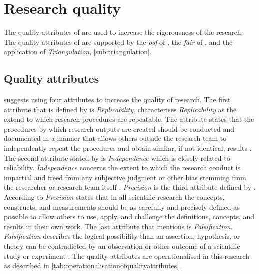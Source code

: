 \section{Research quality}
\label{sec:researchquality}
The quality attributes of \textcite[p.~15--17]{Recker2013} are used to increase the rigorousness of the research. The quality attributes of \textcite[p.~15--17]{Recker2013} are supported by the \textit{\acrfull{osf}} of \textcite{Foster2017}, the \textit{\gls{fair}} of \textcite[Box 2]{Wilkinson2016}, and the application of \textit{Triangulation}, \cref{sub:triangulation}.
\subsection{Quality attributes}
\label{sub:qualityattributes}
\textcite[p. 15-17]{Recker2013} suggests using four attributes to increase the quality of research. The first attribute that is defined by \textcite[p.~15]{Recker2013} is \textit{Replicability}. \textcite[p.~15]{Recker2013} characterises \textit{Replicability} as the extend to which research procedures are repeatable. The attribute states that the procedures by which research outputs are created should be conducted and documented in a manner that allows others outside the research team to independently repeat the procedures and obtain similar, if not identical, results \parencite[p.~15]{Recker2013}. The second attribute stated by \textcite[p.~16]{Recker2013} is \textit{Independence} which is closely related to reliability. \textit{Independence} concerns the extent to which the research conduct is impartial and freed from any subjective judgment or other bias stemming from the researcher or research team itself \parencite[p.~16]{Recker2013}. \textit{Precision} is the third attribute defined by \textcite[p.~16]{Recker2013}. According to \textcite[p.~16]{Recker2013} \textit{Precision} states that in all scientific research the concepts, constructs, and measurements should be as carefully and precisely defined as possible to allow others to use, apply, and challenge the definitions, concepts, and results in their own work. The last attribute that \textcite[p.~16]{Recker2013} mentions is \textit{Falsification}. \textit{Falsification} describes the logical possibility than an assertion, hypothesis, or theory can be contradicted by an observation or other outcome of a scientific study or experiment \parencite[p.~16]{Recker2013}. The quality attributes are operationalised in this research as described in \cref{tab:operationalisationofqualityattributes}.
